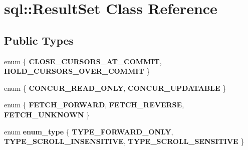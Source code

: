 \hypertarget{classsql_1_1_result_set}{}\section{sql\+:\+:Result\+Set Class Reference}
\label{classsql_1_1_result_set}
\subsection*{Public Types}
\begin{DoxyCompactItemize}
\item 
\hypertarget{classsql_1_1_result_set_accbd504614936c4cbcab47c38b84faba}{}\label{classsql_1_1_result_set_accbd504614936c4cbcab47c38b84faba} 
enum \{ {\bfseries C\+L\+O\+S\+E\+\_\+\+C\+U\+R\+S\+O\+R\+S\+\_\+\+A\+T\+\_\+\+C\+O\+M\+M\+IT}, 
{\bfseries H\+O\+L\+D\+\_\+\+C\+U\+R\+S\+O\+R\+S\+\_\+\+O\+V\+E\+R\+\_\+\+C\+O\+M\+M\+IT}
 \}
\item 
\hypertarget{classsql_1_1_result_set_ab16a16e69b3d7f7dded1d852848ce0e6}{}\label{classsql_1_1_result_set_ab16a16e69b3d7f7dded1d852848ce0e6} 
enum \{ {\bfseries C\+O\+N\+C\+U\+R\+\_\+\+R\+E\+A\+D\+\_\+\+O\+N\+LY}, 
{\bfseries C\+O\+N\+C\+U\+R\+\_\+\+U\+P\+D\+A\+T\+A\+B\+LE}
 \}
\item 
\hypertarget{classsql_1_1_result_set_a2740f7e09e3c91e6d7a24f7142048717}{}\label{classsql_1_1_result_set_a2740f7e09e3c91e6d7a24f7142048717} 
enum \{ {\bfseries F\+E\+T\+C\+H\+\_\+\+F\+O\+R\+W\+A\+RD}, 
{\bfseries F\+E\+T\+C\+H\+\_\+\+R\+E\+V\+E\+R\+SE}, 
{\bfseries F\+E\+T\+C\+H\+\_\+\+U\+N\+K\+N\+O\+WN}
 \}
\item 
\hypertarget{classsql_1_1_result_set_ad279c2005212a639ae9586f405dd0bbc}{}\label{classsql_1_1_result_set_ad279c2005212a639ae9586f405dd0bbc} 
enum {\bfseries enum\+\_\+type} \{ {\bfseries T\+Y\+P\+E\+\_\+\+F\+O\+R\+W\+A\+R\+D\+\_\+\+O\+N\+LY}, 
{\bfseries T\+Y\+P\+E\+\_\+\+S\+C\+R\+O\+L\+L\+\_\+\+I\+N\+S\+E\+N\+S\+I\+T\+I\+VE}, 
{\bfseries T\+Y\+P\+E\+\_\+\+S\+C\+R\+O\+L\+L\+\_\+\+S\+E\+N\+S\+I\+T\+I\+VE}
 \}
\end{DoxyCompactItemize}
